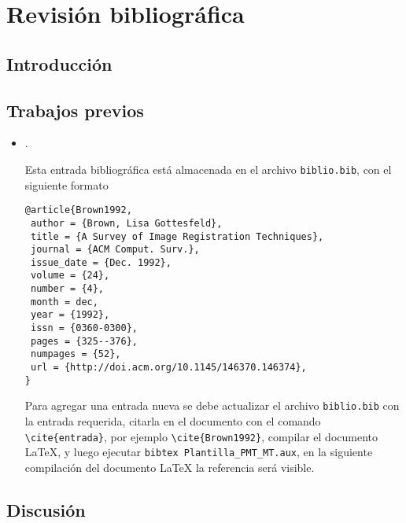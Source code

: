  
\chapter{Revisión bibliográfica}
\section{Introducción}

\section{Trabajos previos}

\begin{itemize}
\item {}.

Esta entrada bibliográfica está almacenada en el archivo \verb|biblio.bib|, con el siguiente formato
\begin{lstlisting}
@article{Brown1992,
 author = {Brown, Lisa Gottesfeld},
 title = {A Survey of Image Registration Techniques},
 journal = {ACM Comput. Surv.},
 issue_date = {Dec. 1992},
 volume = {24},
 number = {4},
 month = dec,
 year = {1992},
 issn = {0360-0300},
 pages = {325--376},
 numpages = {52},
 url = {http://doi.acm.org/10.1145/146370.146374},
} 
\end{lstlisting}

Para agregar una entrada nueva se debe actualizar el archivo \verb|biblio.bib| con la entrada requerida, citarla en el documento con el comando \verb|\cite{entrada}|, por ejemplo \verb|\cite{Brown1992}|, compilar el documento \LaTeX{}, y luego ejecutar 
\texttt{bibtex Plantilla\-\_\-PMT\-\_\-MT.aux}, en la siguiente compilación del documento \LaTeX{} la referencia será visible.
\end{itemize}

\section{Discusión}


